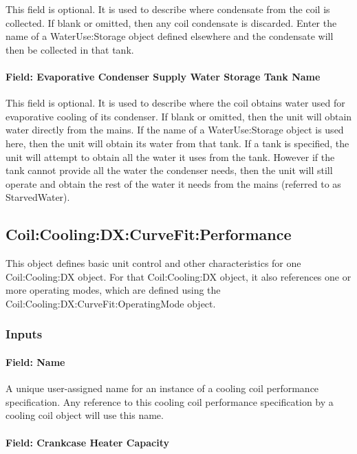 This field is optional. It is used to describe where condensate from the coil is collected. If blank or omitted, then any coil condensate is discarded. Enter the name of a WaterUse:Storage object defined elsewhere and the condensate will then be collected in that tank.

\paragraph{Field: Evaporative Condenser Supply Water Storage Tank Name}\label{field-evaporative-condenser-supply-water-storage-tank-name-000}

This field is optional. It is used to describe where the coil obtains water used for evaporative cooling of its condenser. If blank or omitted, then the unit will obtain water directly from the mains. If the name of a WaterUse:Storage object is used here, then the unit will obtain its water from that tank. If a tank is specified, the unit will attempt to obtain all the water it uses from the tank. However if the tank cannot provide all the water the condenser needs, then the unit will still operate and obtain the rest of the water it needs from the mains (referred to as StarvedWater).

\subsection{Coil:Cooling:DX:CurveFit:Performance}\label{coilcoolingdxcurvefitperformance}

This object defines basic unit control and other characteristics for one Coil:Cooling:DX object. For that Coil:Cooling:DX object, it also references one or more operating modes, which are defined using the Coil:Cooling:DX:CurveFit:OperatingMode object.

\subsubsection{Inputs}\label{inputs-02}

\paragraph{Field: Name}\label{field-name-02}

A unique user-assigned name for an instance of a cooling coil performance specification. Any reference to this cooling coil  performance specification by a cooling coil object will use this name.

\paragraph{Field: Crankcase Heater Capacity}\label{field-crankcase-heater-capacity}

